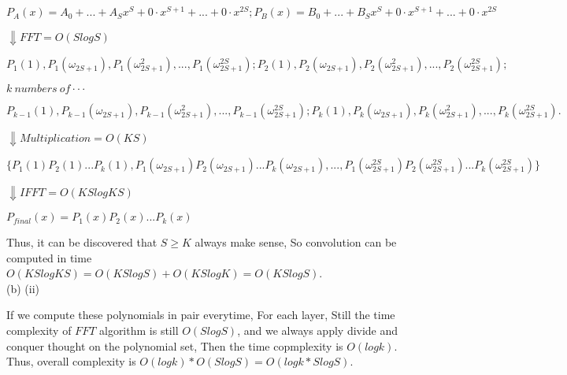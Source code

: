 \documentclass[a4paper,12pt]{article}
\begin{document}
\begin{center} $P_A(x) = A_0 +...+{A_S}{x^S} +0\cdot x^{S+1} +...+0\cdot x^{2S};P_B(x) = B_0 +...+{B_S}{x^S} +0\cdot x^{S+1} +...+0\cdot x^{2S}$ \end{center}
\hspace{15em} $\Downarrow FFT = O(SlogS)$
\begin{center} ${P_{1}(1),P_{1}(\omega_{2S+1}),P_{1}(\omega_{2S+1}^{2}),...,P_{1}(\omega_{2S+1}^{2S})}; {P_{2}(1),P_{2}(\omega_{2S+1}),P_{2}(\omega_{2S+1}^{2}),...,P_{2}(\omega_{2S+1}^{2S})};$ \end{center}
\begin{center} $k\ numbers\ of \cdot\cdot\cdot$ \end{center}
\begin{center} ${P_{k-1}(1),P_{k-1}(\omega_{2S+1}),P_{k-1}(\omega_{2S+1}^{2}),...,P_{k-1}(\omega_{2S+1}^{2S})}; {P_{k}(1),P_{k}(\omega_{2S+1}),P_{k}(\omega_{2S+1}^{2}),...,P_{k}(\omega_{2S+1}^{2S})}.$ \end{center}
\hspace{15em} $\Downarrow Multiplication = O(KS)$
\begin{center} $\{P_{1}(1)P_{2}(1)...P_{k}(1), P_{1}(\omega_{2S+1})P_{2}(\omega_{2S+1})...P_{k}(\omega_{2S+1}), ... , P_{1}(\omega_{2S+1}^{2S})P_{2}(\omega_{2S+1}^{2S})...P_{k}(\omega_{2S+1}^{2S}) \}$ \end{center}
\hspace{15em} $\Downarrow IFFT = O(KSlogKS)$
\begin{center} $P_{final}(x) = P_{1}(x)P_{2}(x)...P_{k}(x)$ \end{center}

Thus, it can be discovered that $S \geq K$ always make sense, So convolution can be computed in time $O(KSlogKS) = O(KSlogS) + O(KSlogK) = O(KSlogS)$.\\

(b) (ii) 

If we compute these polynomials in pair everytime, For each layer, Still the time complexity of $FFT$ algorithm is still $O(SlogS)$, and we always apply divide and conquer thought on the polynomial set, Then the time copmplexity is $O(logk)$.
Thus, overall complexity is $O(logk)*O(SlogS) = O(logk*SlogS)$. 
\end{document}
